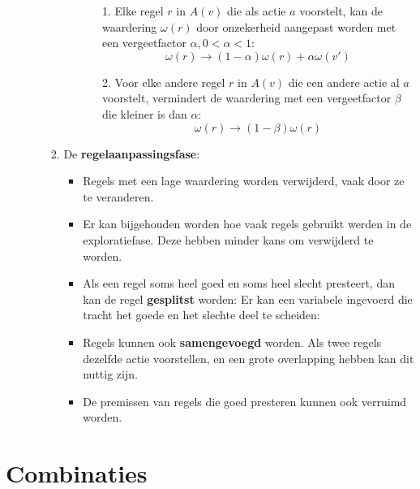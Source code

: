 \begin{itemize}
\begin{itemize}
\begin{enumerate}
\begin{itemize}
				\begin{enumerate}
					\item[1. ] Elke regel $r$ in $A(v)$ die als actie $a$ voorstelt, kan de waardering $\omega(r)$ door onzekerheid aangepast worden met een vergeetfactor $\alpha, 0 < \alpha < 1$:
					$$\omega(r) \rightarrow (1 - \alpha)\omega(r) + \alpha\omega(v')$$
					\item[2. ] Voor elke andere regel $r$ in $A(v)$ die een andere actie al $a$ voorstelt, vermindert de waardering met een vergeetfactor $\beta$ die kleiner is dan $\alpha$:
					$$\omega(r) \rightarrow (1 - \beta)\omega(r)$$
				\end{enumerate}
			\end{itemize}

			\item De \textbf{regelaanpassingsfase}:
			\begin{itemize}
				\item Regels met een lage waardering worden verwijderd, vaak door ze te veranderen.
				\item Er kan bijgehouden worden hoe vaak regels gebruikt werden in de exploratiefase. Deze hebben minder kans om verwijderd te worden.
				\item Als een regel soms heel goed en soms heel slecht presteert, dan kan de regel \textbf{gesplitst} worden:
				Er kan een variabele ingevoerd die tracht het goede en het slechte deel te scheiden:
				\item Regels kunnen ook \textbf{samengevoegd} worden. Als twee regels dezelfde actie voorstellen, en een grote overlapping hebben kan dit nuttig zijn.
				\item De premissen van regels die goed presteren kunnen ook verruimd worden.
			\end{itemize}
		\end{enumerate}
	\end{itemize}
\end{itemize}
\section{Combinaties}

